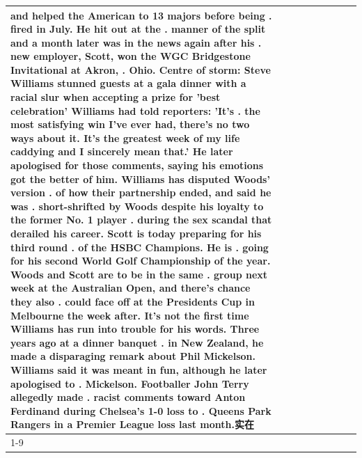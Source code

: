 \begin{table}[H]
\begin{tabular}{lllrlllll}
and helped the American to 13 majors before being . fired in July. He hit out at the . manner of the split and a month later was in the news again after his . new employer, Scott, won the WGC Bridgestone Invitational at Akron, . Ohio. Centre of storm: Steve Williams stunned guests at a gala dinner with a racial slur when accepting a prize for 'best celebration' Williams had told reporters: 'It's . the most satisfying win I've ever had, there's no two ways about it. It's the greatest week of my life caddying and I sincerely mean that.' He later apologised for those comments, saying his emotions got the better of him. Williams has disputed Woods' version . of how their partnership ended, and said he was . short-shrifted by Woods despite his loyalty to the former No. 1 player . during the sex scandal that derailed his career. Scott is today preparing for his third round . of the HSBC Champions. He is . going for his second World Golf Championship of the year. Woods and Scott are to be in the same . group next week at the Australian Open, and there's chance they also . could face off at the Presidents Cup in Melbourne the week after. It's not the first time Williams has run into trouble for his words. Three years ago at a dinner banquet . in New Zealand, he made a disparaging remark about Phil Mickelson. Williams said it was meant in fun, although he later apologised to . Mickelson. Footballer John Terry allegedly made . racist comments toward Anton Ferdinand during Chelsea's 1-0 loss to . Queens Park Rangers in a Premier League loss last month.实在 \\
\cline{1-9}

\end{tabular}
\end{table}
